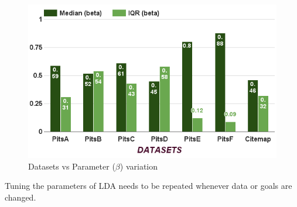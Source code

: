 \documentclass[conference]{IEEEtran}
\theoremstyle{break}
\begin{document}
\begin{figure}[!htbp]
\begin{minipage}{.33\textwidth}
        \includegraphics[width=\linewidth]{./fig/Parameters_variation_b.png}
        \caption{Datasets vs Parameter ($\beta$) variation}
        \label{RQ3:b}
    \end{minipage}
\end{figure}

\begin{lesson}
Tuning the parameters of LDA needs to be repeated whenever data or goals are changed.
\end{lesson}
\end{document}
